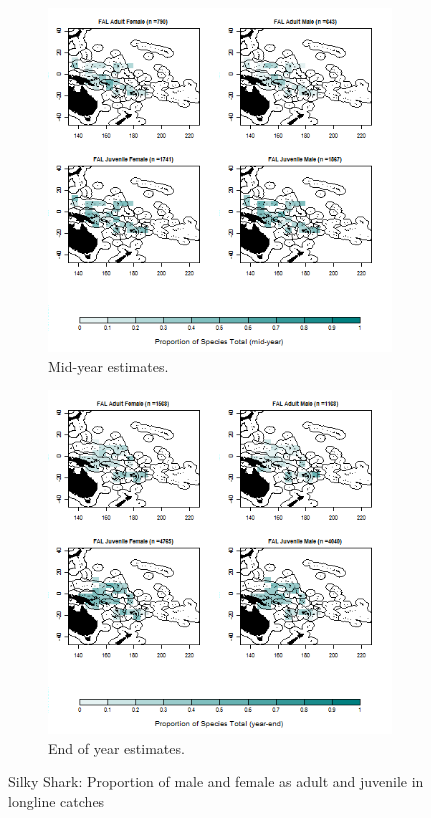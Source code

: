\documentclass[12pt]{SCreport}
\begin{document}
\begin{landscape}
\begin{figure}
\centering
   \begin{subfigure}[b]{0.6\textwidth}
       \includegraphics[width=\textwidth]{../GRAPHICS/Map_maturity_sex_FAL_MY}
       \caption{Mid-year estimates.}
       \label{fig:test1}
   \end{subfigure}
   \begin{subfigure}[b]{0.6\textwidth}
       \includegraphics[width=\textwidth]{../GRAPHICS/Map_maturity_sex_FAL}
       \caption{End of year estimates.}
       \label{fig:test2}
   \end{subfigure}
\caption{Silky Shark: Proportion of male and female as adult and juvenile in longline catches }
\label{fig:test} 
\end{figure}
\end{landscape}
\end{document}

